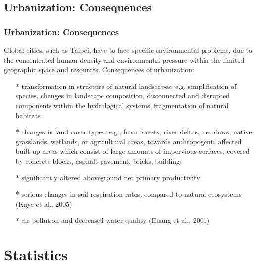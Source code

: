 \documentclass[pdflatex,compress,8pt,
	xcolor={dvipsnames,dvipsnames,svgnames,x11names,table},
	hyperref={	
	breaklinks = true, 
	pdfauthor={Lemenkova Polina}, 
	pdfsubject={Preentation}, 
	pdfcreator={Lemenkova Polina}, 
	pdfproducer={Lemenkova Polina}, 
	colorlinks=true,
	linkcolor=Gold1, 
	citecolor=NavyBlue, 
	urlcolor = NavyBlue, 
	breaklinks = true}]{beamer}
\begin{document}
\subsection{Urbanization: Consequences}
\begin{frame}\frametitle{Urbanization: Consequences}
Global cities, such as Taipei, have to face specific environmental problems, due to the concentrated human density and environmental pressure within the limited geographic space and resources. Consequences of urbanization:

\begin{itemize}
	\item [*] transformation in structure of natural landscapes: e.g. simplification of species, changes in landscape composition, disconnected and disrupted components within the hydrological systems, fragmentation of natural habitats
	\item [*] changes in land cover types: e.g., from forests, river deltas, meadows, native grasslands, wetlands, or agricultural areas, towards anthropogenic affected built-up areas which consist of large amounts of impervious surfaces, covered by concrete blocks, asphalt pavement, bricks, buildings
	\item [*] significantly altered aboveground net primary productivity
	\item [*] serious changes in soil respiration rates, compared to natural ecosystems (Kaye et al., 2005)
	\item [*] air pollution and decreased water quality (Huang et al., 2001)
\end{itemize}
\end{frame}

\section{Statistics}
\end{document}
